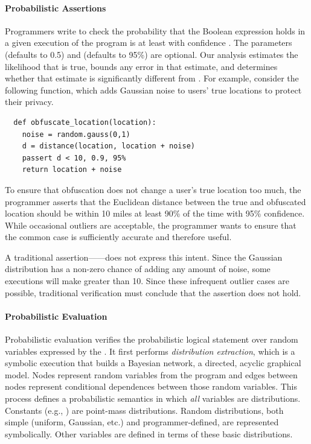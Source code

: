 \paragraph*{Probabilistic Assertions} 
Programmers write 
to check the probability that the Boolean expression  holds in
a given execution of the program is at least  with confidence
. The parameters  (defaults to 0.5) and 
(defaults to 95\%) are optional. Our analysis estimates the likelihood
that  is true, bounds any error in that estimate, and determines
whether that
estimate is significantly different from
. 
For example, consider the following function, which adds
Gaussian noise to users' true locations to protect their privacy.
%
\begin{lstlisting}
  def obfuscate_location(location):
    noise = random.gauss(0,1)
    d = distance(location, location + noise)
    passert d < 10, 0.9, 95%
    return location + noise
\end{lstlisting}
%
To ensure that obfuscation does not change a user's true location too
much, the programmer asserts that the Euclidean distance between the
true and obfuscated location should be within 10 miles at least 90\%
of the time with 95\% confidence. While occasional outliers are
acceptable, the programmer wants to ensure that the common case is
sufficiently accurate and therefore useful.

A traditional assertion------does not
express this intent.  Since the Gaussian distribution has a non-zero
chance of adding any amount of noise, some executions will make
 greater than 10.  Since these infrequent outlier cases are possible,
traditional verification must conclude that the assertion does not hold.

\paragraph*{Probabilistic Evaluation} Probabilistic evaluation
verifies the probabilistic logical statement over random variables
expressed by the \passert. It first performs \emph{distribution extraction},
which is a symbolic execution that builds a Bayesian
network, a directed, acyclic graphical model. Nodes
represent random variables from the program and edges between nodes
represent conditional dependences between those random variables.
This process defines a probabilistic semantics in which \emph{all}
variables are distributions. Constants (e.g., ) are
point-mass distributions.  Random distributions, both simple (uniform,
Gaussian, etc.) and programmer-defined, are represented
symbolically.  Other variables are defined in terms of these basic
distributions.


